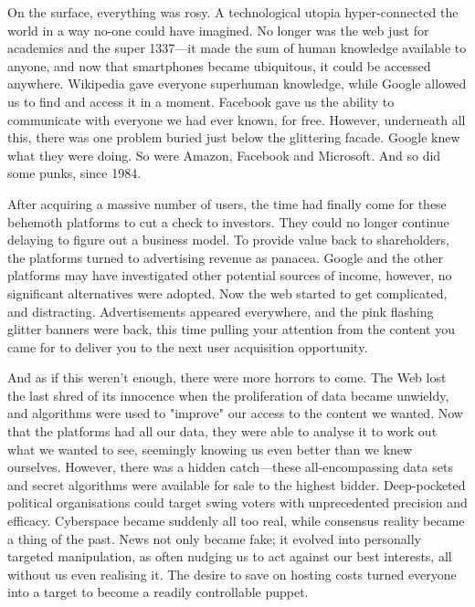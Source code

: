 On the surface, everything was rosy. A technological utopia hyper-connected the world in a way no-one could have imagined. No longer was the web just for academics and the super 1337—it made the sum of human knowledge available to anyone, and now that smartphones became ubiquitous, it could be accessed anywhere. Wikipedia gave everyone superhuman knowledge, while Google allowed us to find and access it in a moment. Facebook gave us the ability to communicate with everyone we had ever known, for free. However, underneath all this, there was one problem buried just below the glittering facade. Google knew what they were doing. So were Amazon, Facebook and Microsoft. And so did some punks, since 1984.

After acquiring a massive number of users, the time had finally come for these behemoth platforms to cut a check to investors. They could no longer continue delaying to figure out a business model. To provide value back to shareholders, the platforms turned to advertising revenue as panacea. Google and the other platforms may have investigated other potential sources of income, however, no significant alternatives were adopted. Now the web started to get complicated, and distracting. Advertisements appeared everywhere, and the pink flashing glitter banners were back, this time pulling your attention from the content you came for to deliver you to the next user acquisition opportunity.

And as if this weren't enough, there were more horrors to come. The Web lost the last shred of its innocence when the proliferation of data became unwieldy, and algorithms were used to "improve" our access to the content we wanted. Now that the platforms had all our data, they were able to analyse it to work out what we wanted to see, seemingly knowing us even better than we knew ourselves. However, there was a hidden catch---these all-encompassing data sets and secret algorithms were available for sale to the highest bidder. Deep-pocketed political organisations could target swing voters with unprecedented precision and efficacy. Cyberspace became suddenly all too real, while consensus reality became a thing of the past. News not only became fake; it evolved into personally targeted manipulation, as often nudging us to act against our best interests, all without us even realising it. The desire to save on hosting costs turned everyone into a target to become a readily controllable puppet. 

